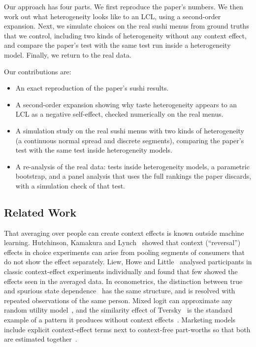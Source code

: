 \documentclass[11pt,journal,a4paper]{IEEEtran}
\begin{document}
Our approach has four parts. We first reproduce the paper's numbers. We then work out what heterogeneity looks
like to an LCL, using a second-order expansion. Next, we simulate choices on the real sushi menus from ground
truths that we control, including two kinds of heterogeneity without any context effect, and compare the
paper's test with the same test run inside a heterogeneity model. Finally, we return to the real data.

Our contributions are:
\begin{itemize}
\item An exact reproduction of the paper's sushi results.
\item A second-order expansion showing why taste heterogeneity appears to an LCL as a negative self-effect,
      checked numerically on the real menus.
\item A simulation study on the real sushi menus with two kinds of heterogeneity (a continuous normal spread
      and discrete segments), comparing the paper's test with the same test inside heterogeneity models.
\item A re-analysis of the real data: tests inside heterogeneity models, a parametric bootstrap, and a panel
      analysis that uses the full rankings the paper discards, with a simulation check of that test.
\end{itemize}

\subsection{Related Work}

That averaging over people can create context effects is known outside machine learning. Hutchinson,
Kamakura and Lynch~\cite{hkl00} showed that context (``reversal'') effects in choice experiments can arise from
pooling segments of consumers that do not show the effect separately. Liew, Howe and Little~\cite{lhl16}
analysed participants in classic context-effect experiments individually and found that few showed the
effects seen in the averaged data. In econometrics, the distinction between true and spurious state
dependence~\cite{heckman81} has the same structure, and is resolved with repeated observations of the same
person. Mixed logit can approximate any random utility model~\cite{mcfadden00}, and the similarity effect of
Tversky~\cite{tversky72} is the standard example of a pattern it produces without context effects~\cite{train09}.
Marketing models include explicit context-effect terms next to context-free part-worths so that both are
estimated together~\cite{rvb11}.
\end{document}
